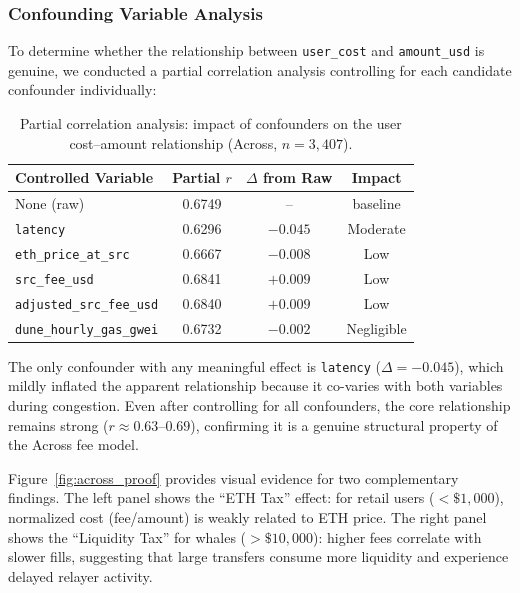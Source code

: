 \subsubsection{Confounding Variable Analysis}

To determine whether the relationship between \texttt{user\_cost} and \texttt{amount\_usd} is genuine, we conducted a partial correlation analysis controlling for each candidate confounder individually:

\begin{table}[h]
\centering
\caption{Partial correlation analysis: impact of confounders on the user cost--amount relationship (Across, $n = 3{,}407$).}
\label{tab:partial_corr}
\begin{tabular}{lccc}
\toprule
\textbf{Controlled Variable} & \textbf{Partial $r$} & \textbf{$\Delta$ from Raw} & \textbf{Impact} \\
\midrule
None (raw)                          & 0.6749 & --       & baseline \\
\texttt{latency}                    & 0.6296 & $-0.045$ & Moderate \\
\texttt{eth\_price\_at\_src}        & 0.6667 & $-0.008$ & Low \\
\texttt{src\_fee\_usd}              & 0.6841 & $+0.009$ & Low \\
\texttt{adjusted\_src\_fee\_usd}    & 0.6840 & $+0.009$ & Low \\
\texttt{dune\_hourly\_gas\_gwei}    & 0.6732 & $-0.002$ & Negligible \\
\bottomrule
\end{tabular}
\end{table}

The only confounder with any meaningful effect is \texttt{latency} ($\Delta = -0.045$), which mildly inflated the apparent relationship because it co-varies with both variables during congestion. Even after controlling for all confounders, the core relationship remains strong ($r \approx 0.63$--$0.69$), confirming it is a genuine structural property of the Across fee model.

Figure~\ref{fig:across_proof} provides visual evidence for two complementary findings. The left panel shows the ``ETH Tax'' effect: for retail users ($< \$1{,}000$), normalized cost (fee/amount) is weakly related to ETH price. The right panel shows the ``Liquidity Tax'' for whales ($> \$10{,}000$): higher fees correlate with slower fills, suggesting that large transfers consume more liquidity and experience delayed relayer activity.


